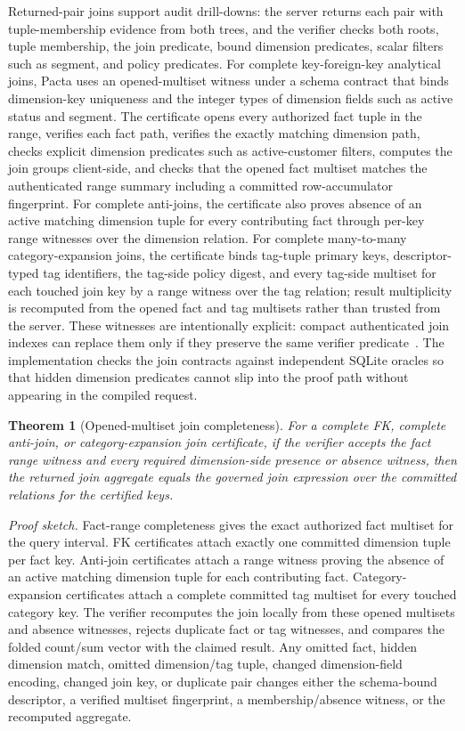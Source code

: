 \documentclass[conference]{IEEEtran}
\newcommand{\sys}{Pacta\xspace}
\newtheorem{theorem}{Theorem}
\begin{document}
Returned-pair joins support audit drill-downs: the server returns each pair with tuple-membership evidence from both trees, and the verifier checks both roots, tuple membership, the join predicate, bound dimension predicates, scalar filters such as segment, and policy predicates. For complete key-foreign-key analytical joins, \sys uses an opened-multiset witness under a schema contract that binds dimension-key uniqueness and the integer types of dimension fields such as active status and segment. The certificate opens every authorized fact tuple in the range, verifies each fact path, verifies the exactly matching dimension path, checks explicit dimension predicates such as active-customer filters, computes the join groups client-side, and checks that the opened fact multiset matches the authenticated range summary including a committed row-accumulator fingerprint. For complete anti-joins, the certificate also proves absence of an active matching dimension tuple for every contributing fact through per-key range witnesses over the dimension relation. For complete many-to-many category-expansion joins, the certificate binds tag-tuple primary keys, descriptor-typed tag identifiers, the tag-side policy digest, and every tag-side multiset for each touched join key by a range witness over the tag relation; result multiplicity is recomputed from the opened fact and tag multisets rather than trusted from the server. These witnesses are intentionally explicit: compact authenticated join indexes can replace them only if they preserve the same verifier predicate~\cite{yang2009join}. The implementation checks the join contracts against independent SQLite oracles so that hidden dimension predicates cannot slip into the proof path without appearing in the compiled request.

\begin{theorem}[Opened-multiset join completeness]
For a complete FK, complete anti-join, or category-expansion join certificate, if the verifier accepts the fact range witness and every required dimension-side presence or absence witness, then the returned join aggregate equals the governed join expression over the committed relations for the certified keys.
\end{theorem}

\noindent\emph{Proof sketch.} Fact-range completeness gives the exact authorized fact multiset for the query interval. FK certificates attach exactly one committed dimension tuple per fact key. Anti-join certificates attach a range witness proving the absence of an active matching dimension tuple for each contributing fact. Category-expansion certificates attach a complete committed tag multiset for every touched category key. The verifier recomputes the join locally from these opened multisets and absence witnesses, rejects duplicate fact or tag witnesses, and compares the folded count/sum vector with the claimed result. Any omitted fact, hidden dimension match, omitted dimension/tag tuple, changed dimension-field encoding, changed join key, or duplicate pair changes either the schema-bound descriptor, a verified multiset fingerprint, a membership/absence witness, or the recomputed aggregate.
\end{document}

